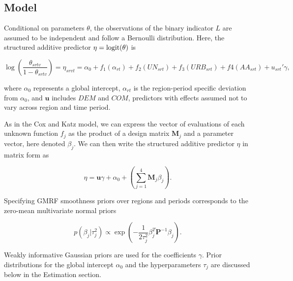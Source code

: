 \vskip1in
\subsection{Model}

Conditional on parameters $\theta$, the observations of the binary indicator $L$ are assumed to be independent and follow a Bernoulli distribution. Here, the structured additive predictor $\eta = {\rm logit}(\theta)$ is 

$$\log{\left(\frac{\theta_{srtv}}{1 - \theta_{srtv}}\right)} = \eta_{srvt} = \alpha_0 + f_1 (\alpha_{rt}) + f_2 (UN_{srt}) + f_3 (URB_{srt}) + f4(AA_{srt}) + u_{srt}' \gamma, $$

\noindent where $\alpha_0$ represents a global intercept, $\alpha_{rt}$ is the region-period specific deviation from $\alpha_0$, and $\mathbf{u}$ includes $DEM$ and $COM$, predictors with effects assumed not to vary across region and time period.
 
As in the Cox and Katz model, we can express the vector of evaluations of each unknown function $f_j$ as the product of a design matrix $\mathbf{M}_j$ and a parameter vector, here denoted $\beta_j$. We can then write the structured additive predictor $\eta$ in matrix form as 
 
$$\eta = \mathbf{u}\gamma + \alpha_0 + \left( \sum_{j=1}^{4} \mathbf{M}_j \beta_j \right). $$
 
Specifying GMRF smoothness priors over regions and periods corresponds to the zero-mean multivariate normal priors

$$ p(\beta_j | \tau^2_j) \propto  \exp{\left(-\frac{1}{2\tau_j^2} \beta_j^T \mathbf{P}^{-1} \beta_j \right)}. $$

Weakly informative Gaussian priors are used for the coefficients $\gamma$. Prior distributions for the global intercept $\alpha_0$ and the hyperparameters $\tau_j$ are discussed below in the Estimation section. 








%
%
%
%
%
%
%


